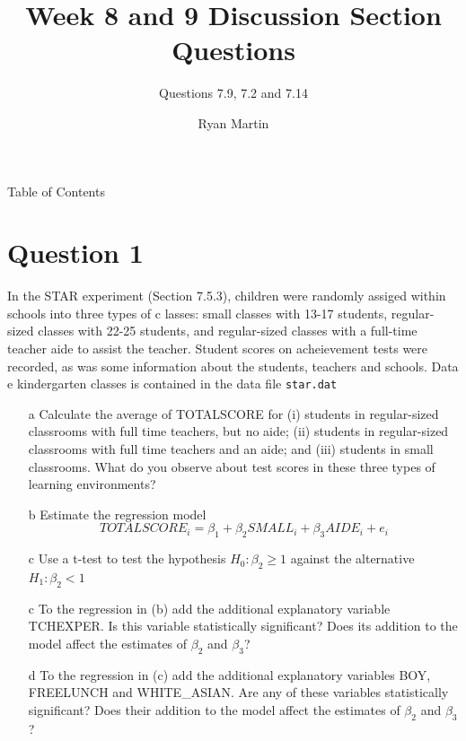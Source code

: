 \documentclass[xcolor={dvipsnames}]{beamer}
\title{ Week 8 and 9 Discussion Section Questions}
\subtitle{Questions 7.9, 7.2 and 7.14}
\author{Ryan Martin}
\begin{document}
	\maketitle


	\begin{frame}{Table of Contents}
		\tableofcontents
	\end{frame}

	\section{Question 1}
	
	\begin{frame}[allowframebreaks]{7.9}
	In the STAR experiment (Section 7.5.3), children were randomly assiged within schools into three types of c lasses: small classes with 13-17 students, regular-sized classes with 22-25 students, and regular-sized classes with a full-time teacher aide to assist the teacher. Student scores on acheievement tests were recorded, as was some information about the students, teachers and schools. Data e kindergarten classes is contained in the data file \texttt{star.dat}
	
	\begin{itemize}
		\item[a] Calculate the average of TOTALSCORE for (i) students in regular-sized classrooms with full time teachers, but no aide; (ii) students in regular-sized classrooms with full time teachers and an aide; and (iii) students in small classrooms. What do you observe about test scores in these three types of learning environments?
		
		
		\item[b] Estimate the regression model $$TOTALSCORE_i = \beta_1 + \beta_2 SMALL_i + \beta_3 AIDE_i + e_i$$
		\item[c] Use a t-test to test the hypothesis $H_0: \beta_2 \ge 1$ against the alternative $H_1: \beta_2 < 1$
		
		\item[c] To the regression in (b) add the additional explanatory variable TCHEXPER. Is this variable statistically significant? Does its addition to the model affect the estimates of $\beta_2$ and $\beta_3$?
		
		\item[d] To the regression in (c) add the additional explanatory variables BOY, FREELUNCH and WHITE\_ASIAN. Are any of these variables statistically significant? Does their addition to the model affect the estimates of $\beta_2$ and $\beta_3$?
		

\end{itemize}
\end{frame}
\end{document}
